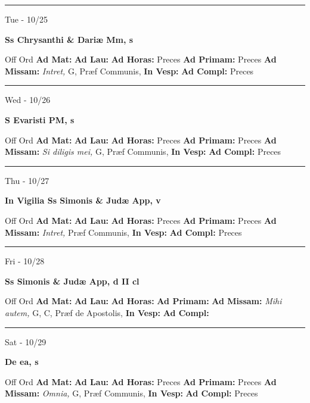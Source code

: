 \documentclass[letterpaper, 10pt]{article}
\begin{document}
\hrule
\begin{center}
Tue - 10/25
\end{center}\textbf{ \large Ss Chrysanthi \& Dariæ Mm, \textnormal{\normalsize s}}
\begin{justify}
Off Ord
\textbf{Ad Mat: }
\textbf{Ad Lau: }
\textbf{Ad Horas: }Preces
\textbf{Ad Primam: }Preces
\textbf{Ad Missam:} \textit{Intret, } G, Præf Communis, 
\textbf{In Vesp: }
\textbf{Ad Compl: }Preces\end{justify}



\hrule
\begin{center}
Wed - 10/26
\end{center}\textbf{ \large S Evaristi PM, \textnormal{\normalsize s}}
\begin{justify}
Off Ord
\textbf{Ad Mat: }
\textbf{Ad Lau: }
\textbf{Ad Horas: }Preces
\textbf{Ad Primam: }Preces
\textbf{Ad Missam:} \textit{Si diligis mei, } G, Præf Communis, 
\textbf{In Vesp: }
\textbf{Ad Compl: }Preces\end{justify}



\hrule
\begin{center}
Thu - 10/27
\end{center}\textbf{ \large In Vigilia Ss Simonis \& Judæ App, \textnormal{\normalsize v}}
\begin{justify}
Off Ord
\textbf{Ad Mat: }
\textbf{Ad Lau: }
\textbf{Ad Horas: }Preces
\textbf{Ad Primam: }Preces
\textbf{Ad Missam:} \textit{Intret, } Præf Communis, 
\textbf{In Vesp: }
\textbf{Ad Compl: }Preces\end{justify}



\hrule
\begin{center}
Fri - 10/28
\end{center}\textbf{ \large Ss Simonis \& Judæ App, \textnormal{\normalsize d II cl}}
\begin{justify}
Off Ord
\textbf{Ad Mat: }
\textbf{Ad Lau: }
\textbf{Ad Horas: }
\textbf{Ad Primam: }
\textbf{Ad Missam:} \textit{Mihi autem, } G, C, Præf de Apostolis, 
\textbf{In Vesp: }
\textbf{Ad Compl: }\end{justify}



\hrule
\begin{center}
Sat - 10/29
\end{center}\textbf{ \large De ea, \textnormal{\normalsize s}}
\begin{justify}
Off Ord
\textbf{Ad Mat: }
\textbf{Ad Lau: }
\textbf{Ad Horas: }Preces
\textbf{Ad Primam: }Preces
\textbf{Ad Missam:} \textit{Omnia, } G, Præf Communis, 
\textbf{In Vesp: }
\textbf{Ad Compl: }Preces\end{justify}
\end{document}
